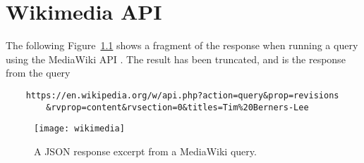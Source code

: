 \chapter{Wikimedia API}
\label{ch:wikimedia}
The following Figure~\ref{fig:wiki} shows a fragment of the response when running a query using the MediaWiki API \cite{mediawiki}. The result has been truncated, and is the response from the query

\begin{lstlisting}
	https://en.wikipedia.org/w/api.php?action=query&prop=revisions
		&rvprop=content&rvsection=0&titles=Tim%20Berners-Lee
\end{lstlisting}

\begin{figure}[h]
	\texttt{[image: wikimedia]}
	\caption{A JSON response excerpt from a MediaWiki query.}
	\label{fig:wiki}
\end{figure}